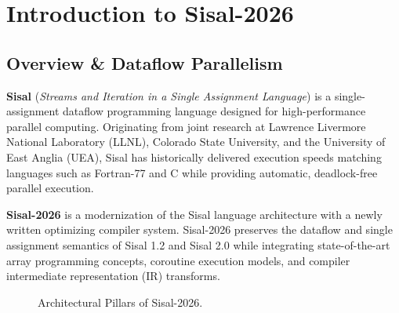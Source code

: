 \chapter{Introduction to Sisal-2026}
\label{chap:introduction}

\section{Overview \& Dataflow Parallelism}
\textbf{Sisal} (\emph{Streams and Iteration in a Single Assignment Language}) is a single-assignment dataflow programming language designed for high-performance parallel computing. Originating from joint research at Lawrence Livermore National Laboratory (LLNL), Colorado State University, and the University of East Anglia (UEA), Sisal has historically delivered execution speeds matching languages such as Fortran-77 and C while providing automatic, deadlock-free parallel execution.

\textbf{Sisal-2026} is a modernization of the Sisal language architecture with a newly written optimizing compiler system. Sisal-2026 preserves the dataflow and single assignment semantics of Sisal 1.2 and Sisal 2.0 while integrating state-of-the-art array programming concepts, coroutine execution models, and compiler intermediate representation (IR) transforms.

\begin{figure}[h!]
\centering
{}
\caption{Architectural Pillars of Sisal-2026.}
\label{fig:pillars}
\end{figure}

